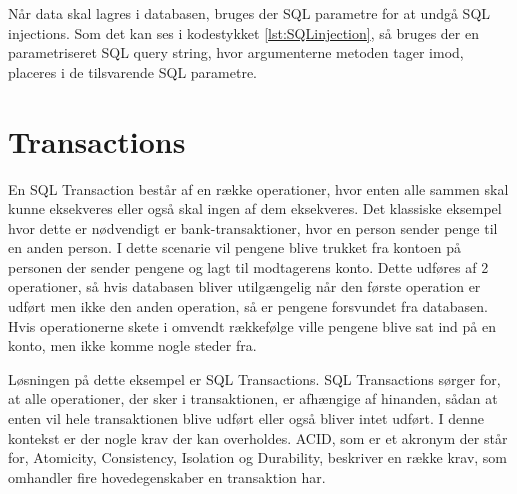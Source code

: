 Når data skal lagres i databasen, bruges der SQL parametre for at undgå SQL injections. Som det kan ses i kodestykket \ref{lst:SQLinjection}, så bruges der en parametriseret SQL query string, hvor argumenterne metoden tager imod, placeres i de tilsvarende SQL parametre.


\section{Transactions}\label{sec:transactions}
En SQL Transaction \cite{sqltransactions} består af en række operationer, hvor enten alle sammen skal kunne eksekveres eller også skal ingen af dem eksekveres. Det klassiske eksempel hvor dette er nødvendigt er bank-transaktioner, hvor en person sender penge til en anden person. I dette scenarie vil pengene blive trukket fra kontoen på personen der sender pengene og lagt til modtagerens konto. Dette udføres af 2 operationer, så hvis databasen bliver utilgængelig når den første operation er udført men ikke den anden operation, så er pengene forsvundet fra databasen. Hvis operationerne skete i omvendt rækkefølge ville pengene blive sat ind på en konto, men ikke komme nogle steder fra. 

Løsningen på dette eksempel er SQL Transactions. SQL Transactions sørger for, at alle operationer, der sker i transaktionen, er afhængige af hinanden, sådan at enten vil hele transaktionen blive udført eller også bliver intet udført. I denne kontekst er der nogle krav der kan overholdes. ACID, som er et akronym der står for, Atomicity, Consistency, Isolation og Durability, beskriver en række krav, som omhandler fire hovedegenskaber en transaktion har. \cite{acid}

